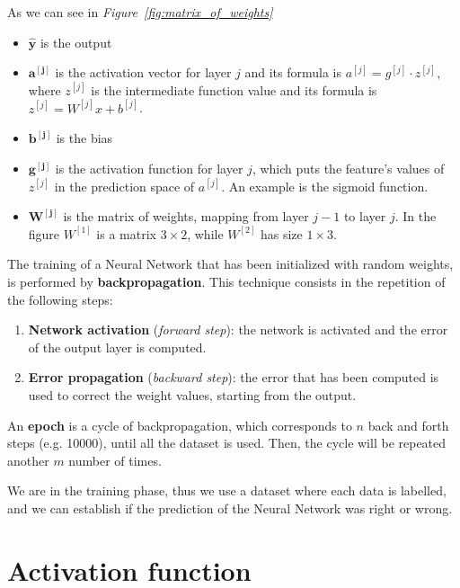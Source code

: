 \documentclass[oneside]{academica}
\begin{document}
As we can see in \textit{Figure~\ref{fig:matrix_of_weights}}

\begin{itemize}
  \item $\boldsymbol{\hat{y}}$ is the output
  \item $\boldsymbol{a^{[j]}}$ is the activation vector for layer $j$ and its formula is $a^{[j]} = g^{[j]} \cdot z^{[j]}$, where $z^{[j]}$ is the intermediate function value and its formula is $z^{[j]} = W^{[j]}x + b^{[j]}$.
  \item $\boldsymbol{b^{[j]}}$ is the bias
  \item $\boldsymbol{g^{[j]}}$ is the activation function for layer $j$, which puts the feature's values of $z^{[j]}$ in the prediction space of $a^{[j]}$. An example is the sigmoid function.
  \item $\boldsymbol{W^{[j]}}$ is the matrix of weights, mapping from layer $j-1$ to layer $j$. In the figure $W^{[1]}$  is a matrix $3 \times 2$, while $W^{[2]}$ has size $1 \times 3$.
\end{itemize}

The training of a Neural Network that has been initialized with random weights, is performed by \textbf{backpropagation}.
This technique consists in the repetition of the following steps:
\begin{enumerate}
  \item \textbf{Network activation} (\textit{forward step}): the network is activated and the error of the output layer is computed.
  \item \textbf{Error propagation} (\textit{backward step}): the error that has been computed is used to correct the weight values, starting from the output.
\end{enumerate}

An \textbf{epoch} is a cycle of backpropagation, which corresponds to $n$ back and forth steps (e.g. 10000), until all the dataset is used.
Then, the cycle will be repeated another $m$ number of times.

We are in the training phase, thus we use a dataset where each data is labelled, and we can establish if the prediction of the Neural Network was right or wrong.

\section{Activation function}
\end{document}
